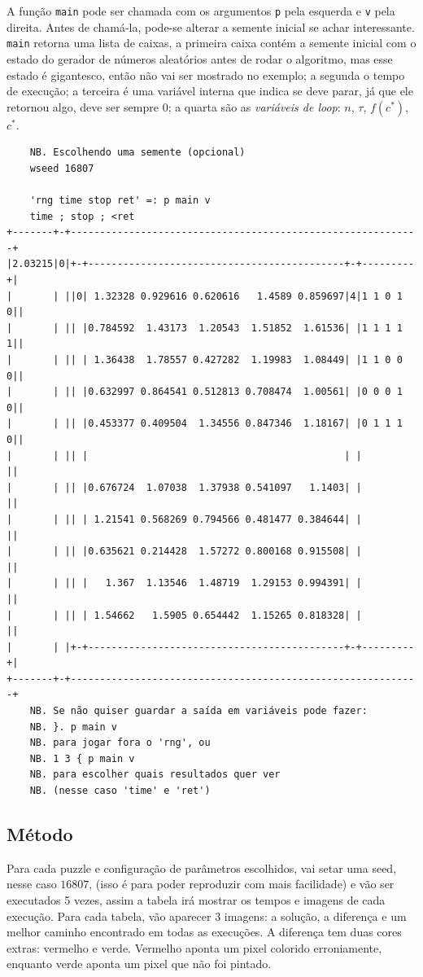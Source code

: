 \documentclass{article}
\newcommand{\inlcode}{\texttt}
\begin{document}
A função \inlcode{main} pode ser chamada com os argumentos
\inlcode{p} pela esquerda e \inlcode{v} pela direita.
Antes de chamá-la, pode-se alterar a semente inicial
se achar interessante.
\inlcode{main} retorna uma lista de caixas,
a primeira caixa contém a semente inicial
com o estado do gerador de números aleatórios
antes de rodar o algoritmo,
mas esse estado é gigantesco,
então não vai ser mostrado no exemplo;
a segunda o tempo de execução;
a terceira é uma variável interna que indica se deve parar,
já que ele retornou algo, deve ser sempre \(0\);
a quarta são as \emph{variáveis de loop}:
\(n\), \(\tau\), \(f(c^*)\), \(c^*\).
\begin{verbatim}
    NB. Escolhendo uma semente (opcional)
    wseed 16807

    'rng time stop ret' =: p main v
    time ; stop ; <ret
+-------+-+------------------------------------------------------------+
|2.03215|0|+-+--------------------------------------------+-+---------+|
|       | ||0| 1.32328 0.929616 0.620616   1.4589 0.859697|4|1 1 0 1 0||
|       | || |0.784592  1.43173  1.20543  1.51852  1.61536| |1 1 1 1 1||
|       | || | 1.36438  1.78557 0.427282  1.19983  1.08449| |1 1 0 0 0||
|       | || |0.632997 0.864541 0.512813 0.708474  1.00561| |0 0 0 1 0||
|       | || |0.453377 0.409504  1.34556 0.847346  1.18167| |0 1 1 1 0||
|       | || |                                            | |         ||
|       | || |0.676724  1.07038  1.37938 0.541097   1.1403| |         ||
|       | || | 1.21541 0.568269 0.794566 0.481477 0.384644| |         ||
|       | || |0.635621 0.214428  1.57272 0.800168 0.915508| |         ||
|       | || |   1.367  1.13546  1.48719  1.29153 0.994391| |         ||
|       | || | 1.54662   1.5905 0.654442  1.15265 0.818328| |         ||
|       | |+-+--------------------------------------------+-+---------+|
+-------+-+------------------------------------------------------------+
    NB. Se não quiser guardar a saída em variáveis pode fazer:
    NB. }. p main v
    NB. para jogar fora o 'rng', ou
    NB. 1 3 { p main v
    NB. para escolher quais resultados quer ver
    NB. (nesse caso 'time' e 'ret')
\end{verbatim}

\subsection{Método}

Para cada puzzle e configuração de parâmetros escolhidos,
vai setar uma seed, nesse caso \(16807\),
(isso é para poder reproduzir com mais facilidade) e
vão ser executados 5 vezes,
assim a tabela irá mostrar
os tempos e imagens de cada execução.
Para cada tabela, vão aparecer 3 imagens:
a solução, a diferença e
um melhor caminho encontrado em todas as execuções.
A diferença tem duas cores extras: vermelho e verde.
Vermelho aponta um pixel colorido erroniamente,
enquanto verde aponta um pixel que não foi pintado.
\end{document}

